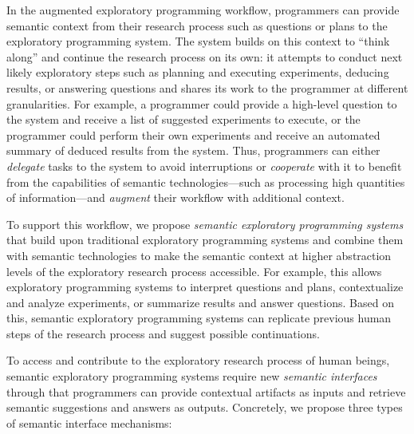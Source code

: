 In the augmented exploratory programming workflow, programmers can provide semantic context from their research process such as questions or plans to the exploratory programming system.
The system builds on this context to ``think along'' and continue the research process on its own:
it attempts to conduct next likely exploratory steps such as planning and executing experiments, deducing results, or answering questions and shares its work to the programmer at different granularities.
For example, a programmer could provide a high-level question to the system and receive a list of suggested experiments to execute, or the programmer could perform their own experiments and receive an automated summary of deduced results from the system.
Thus, programmers can either \emph{delegate} tasks to the system to avoid interruptions or \emph{cooperate} with it to benefit from the capabilities of semantic technologies---such as processing high quantities of information---and \emph{augment} their workflow with additional context.

To support this workflow, we propose \emph{semantic exploratory programming systems} that build upon traditional exploratory programming systems and combine them with semantic technologies to make the semantic context at higher abstraction levels of the exploratory research process accessible.
For example, this allows exploratory programming systems to interpret questions and plans, contextualize and analyze experiments, or summarize results and answer questions.
Based on this, semantic exploratory programming systems can replicate previous human steps of the research process and suggest possible continuations.

To access and contribute to the exploratory research process of human beings, semantic exploratory programming systems require new \emph{semantic interfaces} through that programmers can provide contextual artifacts as inputs and retrieve semantic suggestions and answers as outputs.
Concretely, we propose three types of semantic interface mechanisms:

